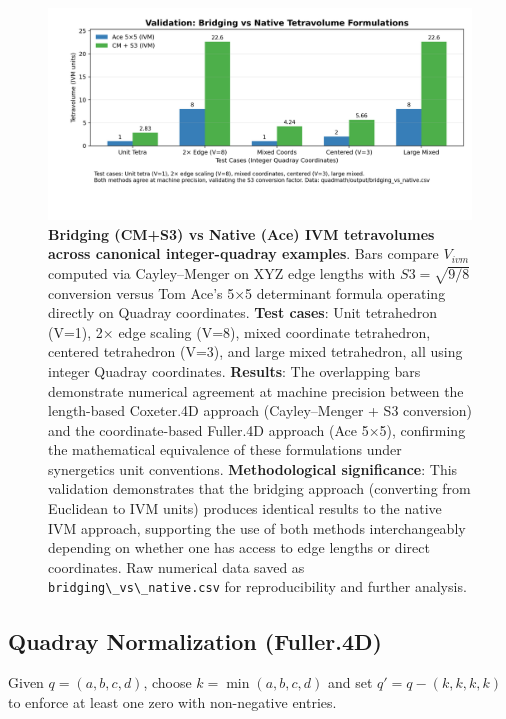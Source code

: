 \documentclass[
  10pt,
]{article}
\newcommand{\passthrough}[1]{#1}
\begin{document}
\begin{figure}
\centering
\includegraphics{../output/figures/bridging_vs_native.png}
\caption{\textbf{Bridging (CM+S3) vs Native (Ace) IVM tetravolumes
across canonical integer-quadray examples}. Bars compare \(V_{ivm}\)
computed via Cayley--Menger on XYZ edge lengths with \(S3=\sqrt{9/8}\)
conversion versus Tom Ace's 5×5 determinant formula operating directly
on Quadray coordinates. \textbf{Test cases}: Unit tetrahedron (V=1), 2×
edge scaling (V=8), mixed coordinate tetrahedron, centered tetrahedron
(V=3), and large mixed tetrahedron, all using integer Quadray
coordinates. \textbf{Results}: The overlapping bars demonstrate
numerical agreement at machine precision between the length-based
Coxeter.4D approach (Cayley--Menger + S3 conversion) and the
coordinate-based Fuller.4D approach (Ace 5×5), confirming the
mathematical equivalence of these formulations under synergetics unit
conventions. \textbf{Methodological significance}: This validation
demonstrates that the bridging approach (converting from Euclidean to
IVM units) produces identical results to the native IVM approach,
supporting the use of both methods interchangeably depending on whether
one has access to edge lengths or direct coordinates. Raw numerical data
saved as \passthrough{\lstinline!bridging\_vs\_native.csv!} for
reproducibility and further analysis.}
\end{figure}

\hypertarget{quadray-normalization-fuller.4d}{%
\subsection{Quadray Normalization
(Fuller.4D)}\label{quadray-normalization-fuller.4d}}

Given \(q=(a,b,c,d)\), choose \(k=\min(a,b,c,d)\) and set
\(q' = q - (k,k,k,k)\) to enforce at least one zero with non-negative
entries.
\end{document}
